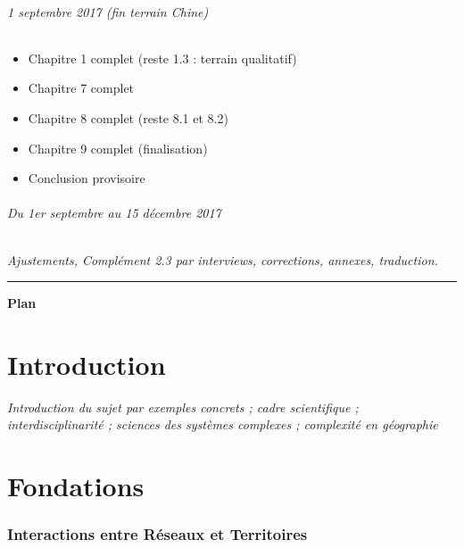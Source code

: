 \paragraph{1 septembre 2017 (fin terrain Chine)}

\begin{itemize}
\item Chapitre 1 complet (reste 1.3 : terrain qualitatif)
\item Chapitre 7 complet
\item Chapitre 8 complet (reste 8.1 et 8.2)
\item Chapitre 9 complet (finalisation)
\item Conclusion provisoire
\end{itemize}


\paragraph{Du 1er septembre au 15 décembre 2017}

\textit{Ajustements, Complément 2.3 par interviews, corrections, annexes, traduction.}



\vspace{2cm}

\hrule

\vspace{0.5cm}

{\hfill
\Huge \textbf{Plan}\hfill
}

\vspace{1.5cm}

\part*{Introduction}

\textit{Introduction du sujet par exemples concrets ; cadre scientifique ; interdisciplinarité ; sciences des systèmes complexes ; complexité en géographie}

\part{Fondations}


\section{Interactions entre Réseaux et Territoires}

